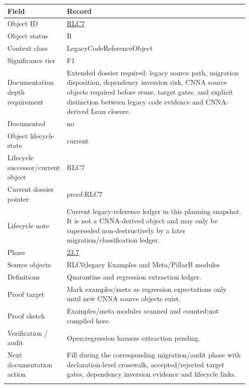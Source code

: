\begin{longtable}{L{0.16\linewidth} L{0.81\linewidth}}
\hline
\textbf{Field} & \textbf{Record}\\
\hline
Object ID & \hyperlink{object-row-RLC7}{RLC7}\\
\hline\addlinespace[0.20em]
Object status & R\\
\hline\addlinespace[0.20em]
Context class & LegacyCodeReferenceObject\\
\hline\addlinespace[0.20em]
Significance tier & F1\\
\hline\addlinespace[0.20em]
Documentation depth requirement & Extended dossier required: legacy source path, migration disposition, dependency inversion risk, CNNA source objects required before reuse, target gates, and explicit distinction between legacy code evidence and CNNA-derived Lean closure.\\
\hline\addlinespace[0.20em]
Documented & no\\
\hline\addlinespace[0.20em]
Object lifecycle state & current\\
\hline\addlinespace[0.20em]
Lifecycle successor/\allowbreak{}current object & RLC7\\
\hline\addlinespace[0.20em]
Current dossier pointer & proof:RLC7\\
\hline\addlinespace[0.20em]
Lifecycle note & Current legacy-reference ledger in this planning snapshot. It is not a CNNA-derived object and may only be superseded non-destructively by a later migration/\allowbreak{}classification ledger.\\
\hline\addlinespace[0.20em]
Phase & \hyperlink{phase-row-23-7}{23.7}\\
\hline\addlinespace[0.20em]
Source objects & RLC0;\newline legacy Examples and Meta/\allowbreak{}PillarB modules\\
\hline\addlinespace[0.20em]
Definitions & Quarantine and regression extraction ledger.\\
\hline\addlinespace[0.20em]
Proof target & Mark examples/\allowbreak{}meta as regression expectations only until new CNNA source objects exist.\\
\hline\addlinespace[0.20em]
Proof sketch & Examples/\allowbreak{}meta modules scanned and counted;\newline not compiled here.\\
\hline\addlinespace[0.20em]
Verification /\allowbreak{} audit & Open;\newline regression harness extraction pending.\\
\hline\addlinespace[0.20em]
Next documentation action & Fill during the corresponding migration/\allowbreak{}audit phase with declaration-level crosswalk, accepted/\allowbreak{}rejected target gates, dependency inversion evidence and lifecycle links.\\
\hline\addlinespace[0.20em]
\end{longtable}
